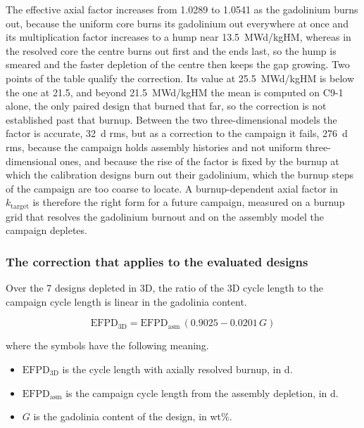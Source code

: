 The effective axial factor increases from 1.0289 to 1.0541 as the
gadolinium burns out, because the uniform core burns its gadolinium out
everywhere at once and its multiplication factor increases to a hump near
\SI{13.5}{MWd/kgHM}, whereas in the resolved core the centre burns out
first and the ends last, so the hump is smeared and the faster depletion
of the centre then keeps the gap growing. Two points of the table
qualify the correction. Its value at \SI{25.5}{MWd/kgHM} is below the
one at 21.5, and beyond \SI{21.5}{MWd/kgHM} the mean is computed on C9-1 alone, the only paired design that burned that far, so the correction is
not established past that burnup. Between the two three-dimensional
models the factor is accurate, \SI{32}{d} rms, but as a correction to
the campaign it fails, \SI{276}{d} rms, because the campaign holds
assembly histories and not uniform three-dimensional ones, and because
the rise of the factor is fixed by the burnup at which the calibration
designs burn out their gadolinium, which the burnup steps of the
campaign are too coarse to locate. A burnup-dependent axial factor in
$k_\mathrm{target}$ is therefore the right form for a future campaign,
measured on a burnup grid that resolves the gadolinium burnout and on
the assembly model the campaign depletes.

\subsubsection{The correction that applies to the evaluated designs}
Over the 7 designs depleted in 3D, the ratio of the 3D cycle length to the campaign cycle length is linear in the
gadolinia content.

\begin{equation}
\mathrm{EFPD}_\mathrm{3D} = \mathrm{EFPD}_\mathrm{asm}\,\left(0.9025 - 0.0201\,G\right)
\label{eq:axial-gd}
\end{equation}

\noindent where the symbols have the following meaning.

\begin{itemize}
  \item $\mathrm{EFPD}_\mathrm{3D}$ is the cycle length with axially resolved burnup,
        in d.

  \item $\mathrm{EFPD}_\mathrm{asm}$ is the campaign cycle length from the assembly depletion, in d.

  \item $G$ is the gadolinia content of the design, in wt\%.
\end{itemize}

